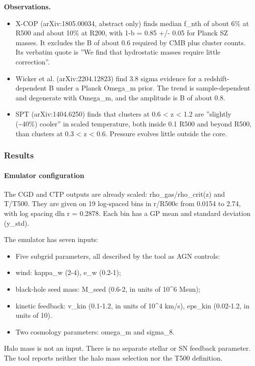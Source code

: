 \documentclass[11pt,a4paper]{article}
\begin{document}
\textbf{Observations.}

\begin{itemize}
  \item X-COP (arXiv:1805.00034, abstract only) finds median f\_nth of about 6\% at R500 and about 10\% at R200, with 1-b = 0.85 +/- 0.05 for Planck SZ masses. It excludes the B of about 0.6 required by CMB plus cluster counts. Its verbatim quote is ''We find that hydrostatic masses require little correction''.
  \item Wicker et al. (arXiv:2204.12823) find 3.8 sigma evidence for a redshift-dependent B under a Planck Omega\_m prior. The trend is sample-dependent and degenerate with Omega\_m, and the amplitude is B of about 0.8.
  \item SPT (arXiv:1404.6250) finds that clusters at 0.6 \textless{} z \textless{} 1.2 are ''slightly (\textasciitilde{}40\%) cooler'' in scaled temperature, both inside 0.1 R500 and beyond R500, than clusters at 0.3 \textless{} z \textless{} 0.6. Pressure evolves little outside the core.
\end{itemize}
\subsubsection*{Results}
\paragraph{Emulator configuration}
The CGD and CTP outputs are already scaled: rho\_gas/rho\_crit(z) and T/T500. They are given on 19 log-spaced bins in r/R500c from 0.0154 to 2.74, with log spacing dln r = 0.2878. Each bin has a GP mean and standard deviation (y\_std).

The emulator has seven inputs:

\begin{itemize}
  \item Five subgrid parameters, all described by the tool as AGN controls:
  \item wind: kappa\_w (2-4), e\_w (0.2-1);
  \item black-hole seed mass: M\_seed (0.6-2, in units of 10\textasciicircum{}6 Msun);
  \item kinetic feedback: v\_kin (0.1-1.2, in units of 10\textasciicircum{}4 km/s), eps\_kin (0.02-1.2, in units of 10).
  \item Two cosmology parameters: omega\_m and sigma\_8.
\end{itemize}
Halo mass is not an input. There is no separate stellar or SN feedback parameter. The tool reports neither the halo mass selection nor the T500 definition.
\end{document}
